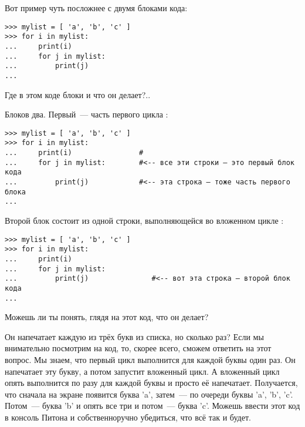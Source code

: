 
Вот пример чуть посложнее с двумя блоками кода:

\begin{listing}
\begin{verbatim}
>>> mylist = [ 'a', 'b', 'c' ]
>>> for i in mylist:
...     print(i)
...     for j in mylist:
...         print(j)
...
\end{verbatim}
\end{listing}

Где в этом коде блоки и что он делает?..

Блоков два. Первый — часть первого цикла :

\begin{listing}
\begin{verbatim}
>>> mylist = [ 'a', 'b', 'c' ]
>>> for i in mylist:
...     print(i)                #
...     for j in mylist:        #<-- все эти строки — это первый блок кода
...         print(j)            #<-- эта строка — тоже часть первого блока
...
\end{verbatim}
\end{listing}

Второй блок состоит из одной строки, выполняющейся во вложенном цикле :

\begin{listing}
\begin{verbatim}
>>> mylist = [ 'a', 'b', 'c' ]
>>> for i in mylist:
...     print(i)
...     for j in mylist:
...         print(j)               #<-- вот эта строка — второй блок кода
...
\end{verbatim}
\end{listing}

Можешь ли ты понять, глядя на этот код, что он делает?

Он напечатает каждую из трёх букв из списка, но сколько раз? Если мы внимательно посмотрим на код, то, скорее всего, сможем ответить на этот вопрос. Мы знаем, что первый цикл  выполнится для каждой буквы один раз. Он напечатает эту букву, а потом запустит вложенный цикл. А вложенный цикл опять выполнится по разу для каждой буквы и просто её напечатает. Получается, что сначала на экране появится буква 'a', затем — по очереди буквы 'a', 'b', 'c'. Потом — буква 'b' и опять все три и потом — буква 'c'. Можешь ввести этот код в консоль Питона и собственноручно убедиться, что всё так и будет.

